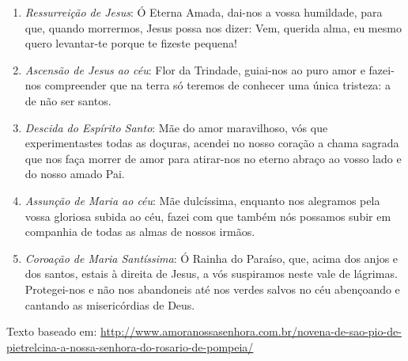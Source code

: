 \documentclass[10pt,twoside,a5paper]{article}
\begin{document}
	\begin{enumerate}
		\item \textit{Ressurreição de Jesus}: Ó Eterna Amada, dai-nos a vossa humildade, para que, quando morrermos, Jesus possa nos dizer: Vem, querida alma, eu mesmo quero levantar-te porque te fizeste pequena!
		
		\item \textit{Ascensão de Jesus ao céu}: Flor da Trindade, guiai-nos ao puro amor e fazei-nos compreender que na terra só teremos de conhecer uma única tristeza: a de não ser santos.
		
		\item \textit{Descida do Espírito Santo}: Mãe do amor maravilhoso, vós que experimentastes todas as doçuras, acendei no nosso coração a chama sagrada que nos faça morrer de amor para atirar-nos no eterno abraço ao vosso lado e do nosso amado Pai.
		
		\item \textit{Assunção de Maria ao céu}: Mãe dulcíssima, enquanto nos alegramos pela vossa gloriosa subida ao céu, fazei com que também nós possamos subir em companhia de todas as almas de nossos irmãos.
		
		\item \textit{Coroação de Maria Santíssima}: Ó Rainha do Paraíso, que, acima dos anjos e dos santos, estais à direita de Jesus, a vós suspiramos neste vale de lágrimas. Protegei-nos e não nos abandoneis até nos verdes salvos no céu abençoando e cantando as misericórdias de Deus.
	\end{enumerate}
	
	Texto baseado em: \url{http://www.amoranossasenhora.com.br/novena-de-sao-pio-de-pietrelcina-a-nossa-senhora-do-rosario-de-pompeia/}
	
	
\end{document}
